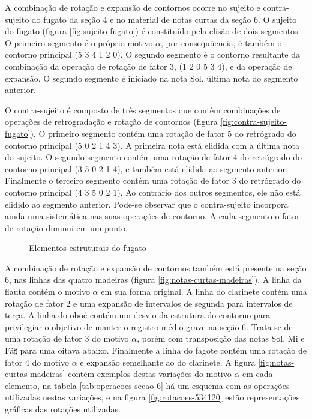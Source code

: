 A combinação de rotação e expansão de contornos ocorre no sujeito e
contra-sujeito do fugato da seção 4 e no material de notas curtas da
seção 6. O sujeito do fugato (figura \ref{fig:sujeito-fugato}) é
constituído pela elisão de dois segmentos. O primeiro segmento é o
próprio motivo $\alpha$, por consequüencia, é também o contorno
principal (5 3 4 1 2 0). O segundo segmento é o contorno resultante da
combinação da operação de rotação de fator 3, (1 2 0 5 3 4), e da
operação de expansão. O segundo segmento é iniciado na nota Sol,
última nota do segmento anterior.

O contra-sujeito é composto de três segmentos que contêm combinações
de operações de retrogradação e rotação de contornos (figura
\ref{fig:contra-sujeito-fugato}). O primeiro segmento contém uma
rotação de fator 5 do retrógrado do contorno principal (5 0 2 1 4
3). A primeira nota está elidida com a última nota do sujeito. O
segundo segmento contém uma rotação de fator 4 do retrógrado do
contorno principal (3 5 0 2 1 4), e também está elidida ao segmento
anterior. Finalmente o terceiro segmento contém uma rotação de fator 3
do retrógrado do contorno principal (4 3 5 0 2 1). Ao contrário dos
outros segmentos, ele não está elidido ao segmento anterior. Pode-se
observar que o contra-sujeito incorpora ainda uma sistemática nas suas
operações de contorno. A cada segmento o fator de rotação diminui em
um ponto.

\begin{figure}
  \centering

  \caption{Elementos estruturais do fugato}
  \label{fig:elementos-fugato}
\end{figure}

A combinação de rotação e expansão de contornos também está presente
na seção 6, nas linhas das quatro madeiras (figura
\ref{fig:notas-curtas-madeiras}). A linha da flauta contém o motivo
$\alpha$ em sua forma original. A linha do clarinete contém uma
rotação de fator 2 e uma expansão de intervalos de segunda para
intervalos de terça. A linha do oboé contém um desvio da estrutura do
contorno para privilegiar o objetivo de manter o registro médio grave
na seção 6. Trata-se de uma rotação de fator 3 do motivo $\alpha$,
porém com transposição das notas Sol, Mi e Fá$\sharp$ para uma oitava
abaixo. Finalmente a linha do fagote contém uma rotação de fator 4 do
motivo $\alpha$ e expansão semelhante ao do clarinete. A figura
\ref{fig:notas-curtas-madeiras} contém exemplos destas variações do
motivo $\alpha$ em cada elemento, na tabela
\ref{tab:operacoes-secao-6} há um esquema com as operações utilizadas
nestas variações, e na figura \ref{fig:rotacoes-534120} estão
representações gráficas das rotações utilizadas.

